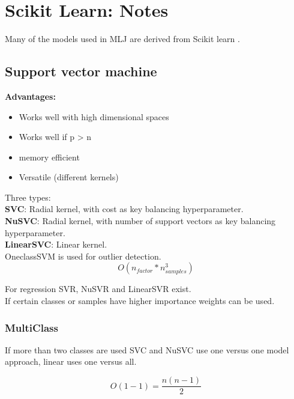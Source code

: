 \documentclass[11pt]{scrartcl} %
\begin{document}
\newpage

\section{Scikit Learn: Notes}

Many of the models used in MLJ are derived from Scikit learn \cite{scikit-learn}.

\subsection{Support vector machine}

\textbf{Advantages:}
\begin{itemize}
	\item Works well with high dimensional spaces
	\item Works well if p > n
	\item memory efficient
	\item Versatile (different kernels)
\end{itemize}

Three types:\\
\textbf{SVC}: Radial kernel, with cost as key balancing hyperparameter.\\
\textbf{NuSVC}: Radial kernel, with number of support vectors as key balancing hyperparameter.\\
\textbf{LinearSVC}: Linear kernel.\\

OneclassSVM is used for outlier detection.\\

\begin{equation}
	O(n_{factor}*n^3_{samples})
\end{equation}

For regression SVR, NuSVR and LinearSVR exist.\\

If certain classes or samples have higher importance weights can be used.

\subsubsection{MultiClass}

If more than two classes are used SVC and NuSVC use one versus one model approach, linear uses
one versus all.

\begin{equation}
	O(1-1) = \frac{n(n-1)}{2}
\end{equation}
\end{document}
